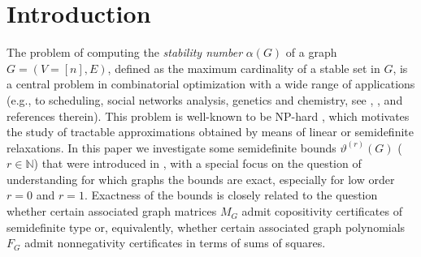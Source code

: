 \documentclass[11pt]{article}
\newcommand{\oN}{{\mathbb N}}
\numberwithin{equation}{section}
\newcommand{\MoL}{\textcolor{red}}
\begin{document}
\section{Introduction}
The problem of computing the {\em stability number} $\alpha(G)$ of a graph $G=(V=[n],E)$, defined as the maximum cardinality of a stable set in $G$, is a central problem in combinatorial optimization with a wide range of applications (e.g., to scheduling, social networks analysis, genetics and chemistry, see \cite{Bomze-survey}, \cite{WuHao}, \cite{Hossain} and references therein).
This problem is well-known to be NP-hard \cite{Karp}, which motivates the study of tractable approximations obtained by means of linear or semidefinite relaxations.  In this paper we investigate some semidefinite bounds $\vartheta^{(r)}(G)$ ($r\in \oN$) that were introduced in \cite{dKP2002}, with a special focus on the question of understanding for which graphs the bounds are exact, especially for low order $r=0$ and $r=1$.  Exactness of the bounds is closely related to the question whether certain associated graph matrices $M_G$ admit copositivity certificates of semidefinite type or, equivalently, 
whether certain associated graph polynomials $F_G$ admit nonnegativity  certificates in terms of sums of squares.
\end{document}
